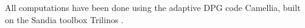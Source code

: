 \documentclass[11pt,onecolumn]{scrartcl}
\begin{document}
%

All computations have been done using the adaptive DPG code Camellia, built on the Sandia toolbox Trilinos \cite{Camellia}.
\end{document}
